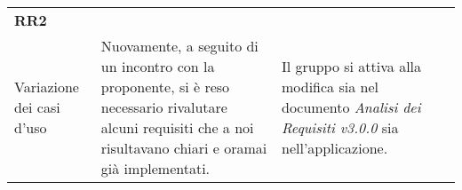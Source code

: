 \begin{longtable}{ 
		>{\centering}p{} 
		>{\raggedright}p{}
		>{\raggedright}p{} 
		>{\centering}p{}
	}
	\textbf{RR2} \\ Variazione dei casi d'uso & 
	Nuovamente, a seguito di un incontro con la proponente, si è reso necessario rivalutare alcuni requisiti che a noi risultavano chiari e oramai già implementati. &
	Il gruppo si attiva alla modifica sia nel documento \textit{Analisi dei Requisiti v3.0.0} sia nell'applicazione.
	\tabularnewline
	
	
\end{longtable}
\renewcommand{\arraystretch}{1}

